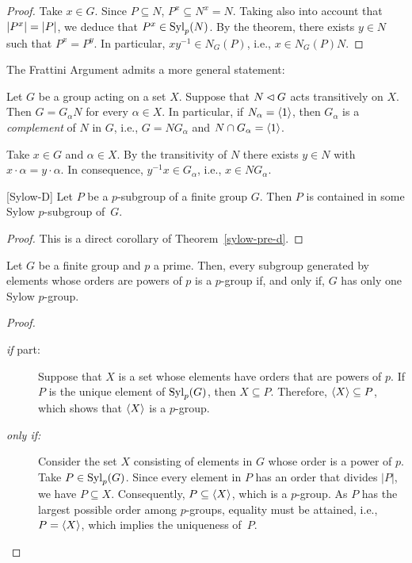 \begin{proof} Take $x\in G$. Since $P\subseteq N$, $P^x\subseteq N^x=N$. Taking also into account that $\left\vert{P^x}\right\vert=\left\vert{P}\right\vert$, we deduce that $P^x\in{\rm Syl}_p(N)$. By the theorem, there exists $y\in N$ such that $P^x=P^y$. In particular, $xy^{-1}\in N_G(P)$, i.e., $x\in N_G(P)N$.  \end{proof}

\begin{rem}\label{frattini-argument-2}
    The\/ \textrm{\rm Frattini Argument} admits a more general statement:

    Let\/ $G$ be a group acting on a set\/ $X$. Suppose that\/ $N\lhd G$ acts transitively on\/ $X$. Then\/ $G = G_\alpha N$ for every\/ $\alpha\in X$. In particular, if\/ $N_\alpha = \langle1\rangle$, then\/ $G_\alpha$ is a \textsl{complement} of\/ $N$ in\/ $G$, i.e., $G=NG_\alpha$ and\/ $N\cap G_\alpha=\langle1\rangle$.

    \textrm{\small\rm Take $x\in G$ and $\alpha\in X$. By the transitivity of $N$ there exists $y\in N$ with $x\cdot\alpha=y\cdot\alpha$. In consequence, $y^{-1}x\in G_\alpha$, i.e., $x\in NG_\alpha$.}
\end{rem}

\begin{thm}\label{sylow-d} {\rm[Sylow-D]}
    Let $P$ be a $p$-subgroup of a finite group $G$. Then $P$ is contained in some Sylow $p$-subgroup of\/~$G$.
\end{thm}

\begin{proof} This is a direct corollary of Theorem~\ref{sylow-pre-d}.  \end{proof}

\begin{cor}
    Let\/ $G$ be a finite group and\/ $p$ a prime. Then, every subgroup generated by elements whose orders are powers of\/ $p$ is a $p$-group if, and only if, $G$ has only one Sylow $p$-group.
\end{cor}
\begin{proof}
\begin{description}
    \item[\textrm{\rm{\it if\/} part:}] Suppose that $X$ is a set whose elements have orders that are powers of $p$. If $P$ is the unique element of ${\rm Syl}_p(G)$, then $X\subseteq P$. Therefore, $\langle X\rangle\subseteq P$, which shows that $\langle X\rangle$ is a $p$-group. 
    \item[\it only if\/\rm:] Consider the set $X$ consisting of elements in $G$ whose order is a power of $p$. Take $P\in{\rm Syl}_p(G)$. Since every element in $P$ has an order that divides $|P|$, we have $P \subseteq X$. Consequently, $P \subseteq \langle X\rangle$, which is a $p$-group. As $P$ has the largest possible order among $p$-groups, equality must be attained, i.e., $P=\langle X\rangle$, which implies the uniqueness of~$P$.
\end{description}
\end{proof}


